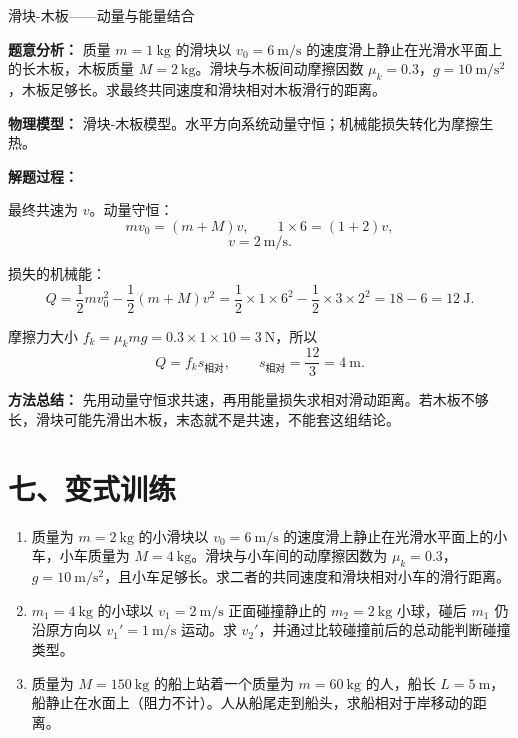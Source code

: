 \begin{examplebox}{滑块-木板——动量与能量结合}

\textbf{题意分析：} 质量 $m=1\ \mathrm{kg}$ 的滑块以 $v_0=6\ \mathrm{m/s}$ 的速度滑上静止在光滑水平面上的长木板，木板质量 $M=2\ \mathrm{kg}$。滑块与木板间动摩擦因数 $\mu_k=0.3$，$g=10\ \mathrm{m/s^2}$，木板足够长。求最终共同速度和滑块相对木板滑行的距离。

\textbf{物理模型：} 滑块-木板模型。水平方向系统动量守恒；机械能损失转化为摩擦生热。

\textbf{解题过程：}

最终共速为 $v$。动量守恒：
\[
mv_0=(m+M)v,\qquad 1\times6=(1+2)v,
\]
\[
v=2\ \mathrm{m/s}.
\]

损失的机械能：
\[
Q=\frac12mv_0^2-\frac12(m+M)v^2
=\frac12\times1\times6^2-\frac12\times3\times2^2
=18-6=12\ \mathrm{J}.
\]

摩擦力大小 $f_k=\mu_kmg=0.3\times1\times10=3\ \mathrm{N}$，所以
\[
Q=f_k s_{\text{相对}},\qquad s_{\text{相对}}=\frac{12}{3}=4\ \mathrm{m}.
\]

\textbf{方法总结：} 先用动量守恒求共速，再用能量损失求相对滑动距离。若木板不够长，滑块可能先滑出木板，末态就不是共速，不能套这组结论。
\end{examplebox}

\section*{七、变式训练}

\begin{enumerate}
  \item 质量为 $m = 2\ \mathrm{kg}$ 的小滑块以 $v_0 = 6\ \mathrm{m/s}$ 的速度滑上静止在光滑水平面上的小车，小车质量为 $M = 4\ \mathrm{kg}$。滑块与小车间的动摩擦因数为 $\mu_k = 0.3$，$g=10\ \mathrm{m/s^2}$，且小车足够长。求二者的共同速度和滑块相对小车的滑行距离。
  \begin{center}
  
  \end{center}

  \item $m_1 = 4\ \mathrm{kg}$ 的小球以 $v_1 = 2\ \mathrm{m/s}$ 正面碰撞静止的 $m_2 = 2\ \mathrm{kg}$ 小球，碰后 $m_1$ 仍沿原方向以 $v_1' = 1\ \mathrm{m/s}$ 运动。求 $v_2'$，并通过比较碰撞前后的总动能判断碰撞类型。

  \item 质量为 $M = 150\ \mathrm{kg}$ 的船上站着一个质量为 $m = 60\ \mathrm{kg}$ 的人，船长 $L = 5\ \mathrm{m}$，船静止在水面上（阻力不计）。人从船尾走到船头，求船相对于岸移动的距离。
  \begin{center}
  
  \end{center}
\end{enumerate}

